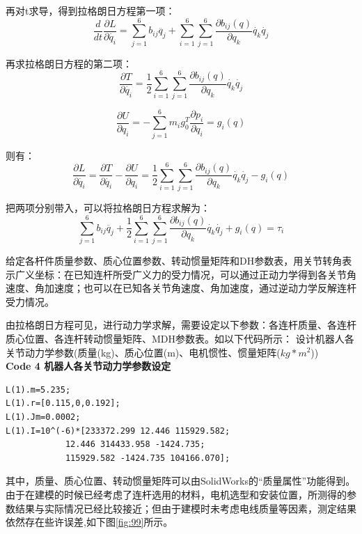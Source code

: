 \documentclass[12pt]{ctexart}
\begin{document}
再对t求导，得到拉格朗日方程第一项：
\begin{equation}
    \frac{d}{dt}\frac{\partial L}{\partial\dot{q_i}}=\sum_{j=1}^6b_{ij}\ddot{q_j}+\sum_{i=1}^6\sum_{j=1}^6\frac{\partial b_{ij}(q)}{\partial q_k}\dot{q_k}\dot{q_j}
\end{equation}

再求拉格朗日方程的第二项：
\begin{equation}
    \frac{\partial T}{\partial \dot{q_i}}=\frac{1}{2}\sum_{i=1}^6\sum_{j=1}^6\frac{\partial b_{ij}(q)}{\partial q_k}\dot{q_k}\dot{q_j}
\end{equation}

\begin{equation}
    \frac{\partial U}{\partial q_i}=-\sum_{j=1}^6m_ig_0^T\frac{\partial p_i}{\partial q_i}=g_i(q)
\end{equation}

则有：
\begin{equation}
    \frac{\partial L}{\partial\dot{q_i}}= \frac{\partial T}{\partial \dot{q_i}}- \frac{\partial U}{\partial q_i}=\frac{1}{2}\sum_{i=1}^6\sum_{j=1}^6\frac{\partial b_{ij}(q)}{\partial q_k}\dot{q_k}\dot{q_j}-g_i(q)
\end{equation}


把两项分别带入，可以将拉格朗日方程求解为： 
\begin{equation}
    \sum_{j=1}^6b_{ij}\ddot{q_j}+\frac{1}{2}\sum_{i=1}^6\sum_{j=1}^6\frac{\partial b_{ij}(q)}{\partial q_k}\dot{q_k}\dot{q_j}+g_i(q)=\tau_i
\end{equation}

给定各杆件质量参数、质心位置参数、转动惯量矩阵和DH参数表，用关节转角表示广义坐标：在已知连杆所受广义力的受力情况，可以通过正动力学得到各关节角速度、角加速度；也可以在已知各关节角速度、角加速度，通过逆动力学反解连杆受力情况。 

由拉格朗日方程可见，进行动力学求解，需要设定以下参数：各连杆质量、各连杆质心位置、各连杆转动惯量矩阵、MDH参数表。如以下代码所示： 
设计机器人各关节动力学参数(质量(kg)、质心位置(m)、电机惯性、惯量矩阵($kg*m^2$))\\

\textbf{Code 4 \quad 机器人各关节动力学参数设定}
\begin{lstlisting}
L(1).m=5.235; 
L(1).r=[0.115,0,0.192]; 
L(1).Jm=0.0002; 
L(1).I=10^(-6)*[233372.299 12.446 115929.582; 
            12.446 314433.958 -1424.735; 
            115929.582 -1424.735 104166.070]; 
\end{lstlisting}

其中，质量、质心位置、转动惯量矩阵可以由SolidWorks的“质量属性”功能得到。由于在建模的时候已经考虑了连杆选用的材料，电机选型和安装位置，所测得的参数结果与实际情况已经比较接近；但由于建模时未考虑电线质量等因素，测定结果依然存在些许误差,如下图\ref{fig:99}所示。
\end{document}
